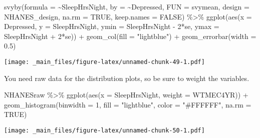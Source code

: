 \documentclass[
]{book}
\newenvironment{Shaded}{\begin{snugshade}}{\end{snugshade}}
\newcommand{\AttributeTok}[1]{\textcolor[rgb]{0.77,0.63,0.00}{#1}}
\newcommand{\ConstantTok}[1]{\textcolor[rgb]{0.00,0.00,0.00}{#1}}
\newcommand{\DecValTok}[1]{\textcolor[rgb]{0.00,0.00,0.81}{#1}}
\newcommand{\FloatTok}[1]{\textcolor[rgb]{0.00,0.00,0.81}{#1}}
\newcommand{\FunctionTok}[1]{\textcolor[rgb]{0.00,0.00,0.00}{#1}}
\newcommand{\NormalTok}[1]{#1}
\newcommand{\SpecialCharTok}[1]{\textcolor[rgb]{0.00,0.00,0.00}{#1}}
\newcommand{\StringTok}[1]{\textcolor[rgb]{0.31,0.60,0.02}{#1}}
\theoremstyle{definition}
\theoremstyle{definition}
\theoremstyle{definition}
\theoremstyle{definition}
\theoremstyle{remark}
\begin{document}
\begin{Shaded}
\begin{Highlighting}[]
\FunctionTok{svyby}\NormalTok{(}\AttributeTok{formula =} \SpecialCharTok{\textasciitilde{}}\NormalTok{SleepHrsNight, }\AttributeTok{by =} \SpecialCharTok{\textasciitilde{}}\NormalTok{Depressed, }\AttributeTok{FUN =}\NormalTok{ svymean, }
      \AttributeTok{design =}\NormalTok{ NHANES\_design, }\AttributeTok{na.rm =} \ConstantTok{TRUE}\NormalTok{, }\AttributeTok{keep.names =} \ConstantTok{FALSE}\NormalTok{) }\SpecialCharTok{\%\textgreater{}\%}
  \FunctionTok{ggplot}\NormalTok{(}\FunctionTok{aes}\NormalTok{(}\AttributeTok{x =}\NormalTok{ Depressed, }\AttributeTok{y =}\NormalTok{ SleepHrsNight, }
             \AttributeTok{ymin =}\NormalTok{ SleepHrsNight }\SpecialCharTok{{-}} \DecValTok{2}\SpecialCharTok{*}\NormalTok{se, }\AttributeTok{ymax =}\NormalTok{ SleepHrsNight }\SpecialCharTok{+} \DecValTok{2}\SpecialCharTok{*}\NormalTok{se)) }\SpecialCharTok{+}
  \FunctionTok{geom\_col}\NormalTok{(}\AttributeTok{fill =} \StringTok{"lightblue"}\NormalTok{) }\SpecialCharTok{+}
  \FunctionTok{geom\_errorbar}\NormalTok{(}\AttributeTok{width =} \FloatTok{0.5}\NormalTok{)}
\end{Highlighting}
\end{Shaded}

\texttt{[image: \_main\_files/figure-latex/unnamed-chunk-49-1.pdf]}

You need raw data for the distribution plots, so be sure to weight the variables.

\begin{Shaded}
\begin{Highlighting}[]
\NormalTok{NHANESraw }\SpecialCharTok{\%\textgreater{}\%} 
  \FunctionTok{ggplot}\NormalTok{(}\FunctionTok{aes}\NormalTok{(}\AttributeTok{x =}\NormalTok{ SleepHrsNight, }\AttributeTok{weight =}\NormalTok{ WTMEC4YR)) }\SpecialCharTok{+} 
  \FunctionTok{geom\_histogram}\NormalTok{(}\AttributeTok{binwidth =} \DecValTok{1}\NormalTok{, }\AttributeTok{fill =} \StringTok{"lightblue"}\NormalTok{, }\AttributeTok{color =} \StringTok{"\#FFFFFF"}\NormalTok{, }\AttributeTok{na.rm =} \ConstantTok{TRUE}\NormalTok{)}
\end{Highlighting}
\end{Shaded}

\texttt{[image: \_main\_files/figure-latex/unnamed-chunk-50-1.pdf]}
\end{document}
